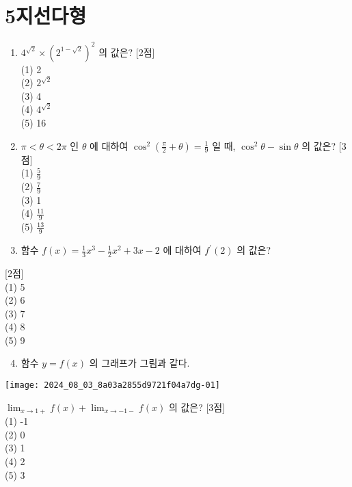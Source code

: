 \documentclass[10pt]{article}
\begin{document}
\section*{5지선다형}
\begin{enumerate}
  \item \(4^{\sqrt{2}} \times\left(2^{1-\sqrt{2}}\right)^{2}\) 의 값은? [2점]\\
(1) 2\\
(2) \(2^{\sqrt{2}}\)\\
(3) 4\\
(4) \(4^{\sqrt{2}}\)\\
(5) 16

  \item \(\pi<\theta<2 \pi\) 인 \(\theta\) 에 대하여 \(\cos ^{2}\left(\frac{\pi}{2}+\theta\right)=\frac{1}{9}\) 일 때, \(\cos ^{2} \theta-\sin \theta\) 의 값은? [3점]\\
(1) \(\frac{5}{9}\)\\
(2) \(\frac{7}{9}\)\\
(3) 1\\
(4) \(\frac{11}{9}\)\\
(5) \(\frac{13}{9}\)

  \item 함수 \(f(x)=\frac{1}{3} x^{3}-\frac{1}{2} x^{2}+3 x-2\) 에 대하여 \(f^{\prime}(2)\) 의 값은?

\end{enumerate}

[2점]\\
(1) 5\\
(2) 6\\
(3) 7\\
(4) 8\\
(5) 9

\begin{enumerate}
  \setcounter{enumi}{3}
  \item 함수 \(y=f(x)\) 의 그래프가 그림과 같다.
\end{enumerate}

\begin{center}
\texttt{[image: 2024\_08\_03\_8a03a2855d9721f04a7dg-01]}
\end{center}

\(\lim _{x \rightarrow 1+} f(x)+\lim _{x \rightarrow-1-} f(x)\) 의 값은? [3점]\\
(1) -1\\
(2) 0\\
(3) 1\\
(4) 2\\
(5) 3
\end{document}
